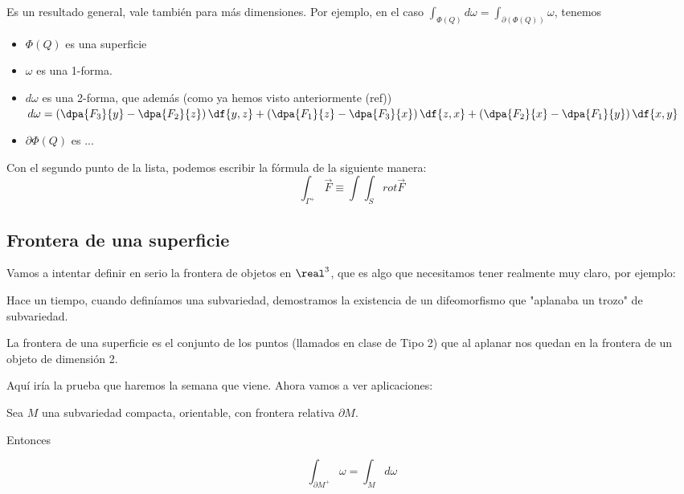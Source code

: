 \obs Es un resultado general, vale también para más dimensiones. Por ejemplo, en el caso $\displaystyle \int_{\Phi(Q)} d\omega = \int_{\partial (\Phi(Q))} \omega$, tenemos
\begin{itemize}
\item $\Phi(Q)$ es una superficie
\item $\omega$ es una 1-forma.
\item $d\omega$ es una 2-forma, que además (como ya hemos visto anteriormente (ref)) $d\omega = \left(\dpa{F_3}{y}-\dpa{F_2}{z}\right) \df{y,z} + 
\left(\dpa{F_1}{z}-\dpa{F_3}{x}\right) \df{z,x} + 
\left(\dpa{F_2}{x}-\dpa{F_1}{y}\right) \df{x,y}$
\item $\partial \Phi(Q)$ es ... 
\end{itemize} 
Con el segundo punto de la lista, podemos escribir la fórmula de la siguiente manera:
\[
\int_{\Gamma^+} \overrightarrow{F} \equiv \int \int_S rot \overrightarrow{F}
\]

\subsection{Frontera de una superficie}
Vamos a intentar definir en serio la frontera de objetos en $\real^3$, que es algo que necesitamos tener realmente muy claro, por ejemplo:


Hace un tiempo, cuando definíamos una subvariedad, demostramos la existencia de un difeomorfismo que "aplanaba un trozo" de subvariedad. 

La frontera de una superficie es el conjunto de los puntos (llamados en clase de Tipo 2) que al aplanar nos quedan en la frontera de un objeto de dimensión 2.

Aquí iría la prueba que haremos la semana que viene. Ahora vamos a ver aplicaciones:



\begin{theorem}
Sea $M$ una subvariedad compacta, orientable, con frontera relativa $\partial  M$.

Entonces

\[\int_{\partial  M^+}\omega = \int_M d\omega \]

\end{theorem}

